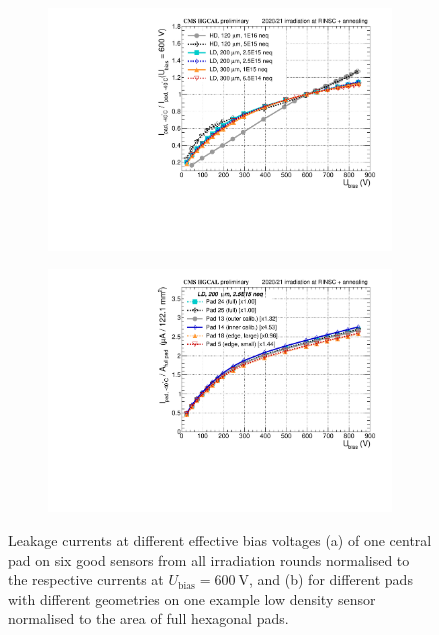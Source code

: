 \begin{figure}
	\captionsetup[subfigure]{aboveskip=-1pt,belowskip=-1pt}
	\centering
	\begin{subfigure}[b]{0.49\textwidth}
		\includegraphics[width=0.999\textwidth]{plots/channel_iv/channel_IV_sensors_sensors.pdf}
		\subcaption{
		}
		\label{plot:pad_IV_sensor}
	\end{subfigure}
	\hfill
	\begin{subfigure}[b]{0.49\textwidth}
		\includegraphics[width=0.999\textwidth]{plots/channel_iv/channel_IV_sensors_channels.pdf}
		\subcaption{
		}
		\label{plot:pad_IV_channels}
	\end{subfigure}
	\caption{
		Leakage currents at different effective bias voltages (a) of one central pad on six good sensors from all irradiation rounds normalised to the respective currents at $U_\text{bias}=\SI{600}{\volt}$, 
		and (b) for different pads with different geometries on one example low density sensor normalised to the area of full hexagonal pads.
	}
\end{figure}



